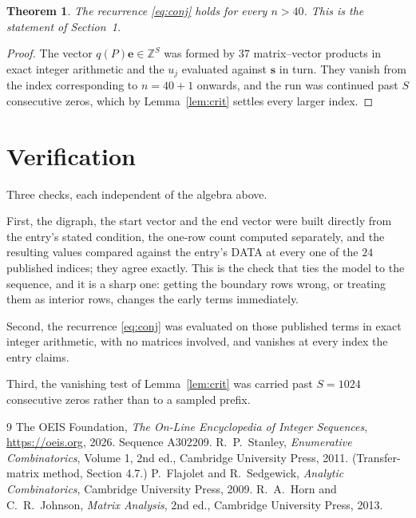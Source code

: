 \documentclass[11pt,a4paper]{article}
\theoremstyle{plain}
\newtheorem{theorem}{Theorem}
\theoremstyle{definition}
\begin{document}
\begin{theorem}
The recurrence \eqref{eq:conj} holds for every $n>40$. This is the statement of
Section~1.
\end{theorem}

\begin{proof}
The vector $q(P)\mathbf{e}\in\mathbb{Z}^{S}$ was formed by $37$ matrix--vector
products in exact integer arithmetic and the $u_j$ evaluated against $\mathbf{s}$ in turn.
They vanish from the index corresponding to $n=40+1$ onwards, and the run was continued
past $S$ consecutive zeros, which by Lemma~\ref{lem:crit} settles every larger index.
\end{proof}

\section{Verification}

Three checks, each independent of the algebra above.

First, the digraph, the start vector and the end vector were built directly from the
entry's stated condition, the one-row count computed separately, and the resulting values
compared against the entry's DATA at every one of the $24$ published indices; they
agree exactly. This is the check that ties the model to the sequence, and it is a sharp one:
getting the boundary rows wrong, or treating them as interior rows, changes the early terms
immediately.

Second, the recurrence \eqref{eq:conj} was evaluated on those published terms in exact
integer arithmetic, with no matrices involved, and vanishes at every index the entry claims.

Third, the vanishing test of Lemma~\ref{lem:crit} was carried past $S=1024$ consecutive
zeros rather than to a sampled prefix.

\begin{thebibliography}{9}
 The OEIS Foundation, \emph{The On-Line Encyclopedia of Integer
Sequences}, \url{https://oeis.org}, 2026. Sequence A302209.
 R.~P.~Stanley, \emph{Enumerative Combinatorics}, Volume 1, 2nd ed.,
Cambridge University Press, 2011. (Transfer-matrix method, Section 4.7.)
 P.~Flajolet and R.~Sedgewick, \emph{Analytic Combinatorics}, Cambridge
University Press, 2009.
 R.~A.~Horn and C.~R.~Johnson, \emph{Matrix Analysis}, 2nd ed., Cambridge
University Press, 2013.
\end{thebibliography}
\end{document}
